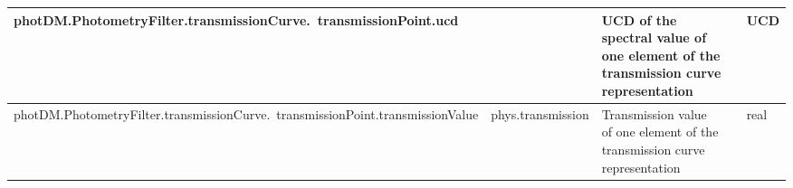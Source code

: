\documentclass[11pt,a4paper]{ivoa}
\begin{document}
\begin{appendices}
\begin{table}[H]
\begin{adjustbox}{angle=90}
\begin{tabular}{p{2.5in}|p{1.5in}|p{2in}|p{0.74in}|p{0.35in}}
\hline
\multicolumn{1}{p{2.5in}}{{\fontsize{8pt}{8pt}
\selectfont photDM.PhotometryFilter.transmissionCurve.\ transmissionPoint.ucd}} &
\multicolumn{1}{p{1.5in}}{{\fontsize{8pt}{8pt}\selectfont }} &
\multicolumn{1}{p{2in}}{{\fontsize{8pt}{8pt}\selectfont UCD of the spectral value
of one element of the transmission curve representation}} &
\multicolumn{1}{p{0.74in}}{} &
\multicolumn{1}{p{0.35in}}{{\fontsize{8pt}{8pt}\selectfont UCD}} \\
\hline
\multicolumn{1}{p{2.5in}}{{\fontsize{8pt}{8pt}
\selectfont photDM.PhotometryFilter.transmissionCurve.\ transmissionPoint.transmissionValue}} &
\multicolumn{1}{p{1.5in}}{{\fontsize{8pt}{8pt}
\selectfont phys.transmission}} &
\multicolumn{1}{p{2in}}{{\fontsize{8pt}{8pt}\selectfont Transmission value of
one element of the transmission curve representation}} &
\multicolumn{1}{p{0.74in}}{} &
\multicolumn{1}{p{0.35in}}{{\fontsize{8pt}{8pt}\selectfont real}} \\
\hline

\end{tabular}
\end{adjustbox}
 \end{table}





\newpage



\end{appendices}
\end{document}
